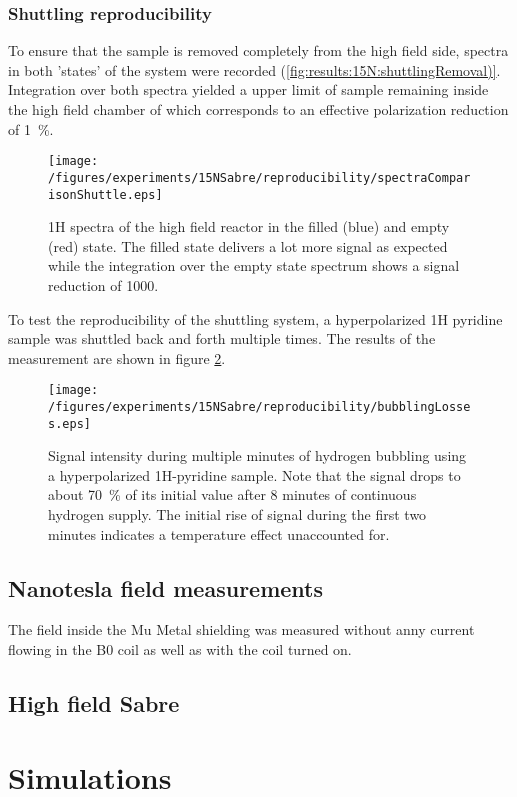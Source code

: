		\subsubsection{Shuttling reproducibility}
		To ensure that the sample is removed completely from the high field side, spectra in both 'states' of the system were recorded (\ref{fig:results:15N:shuttlingRemoval)}. Integration over both spectra yielded a upper limit of sample remaining inside the high field chamber of which corresponds to an effective polarization reduction of \SI{1}{\percent}.
		\begin{figure}
			\label{fig:results:15N:shuttlingRemoval}
			\centering
			\texttt{[image: /figures/experiments/15NSabre/reproducibility/spectraComparisonShuttle.eps]}
			\caption{1H spectra of the high field reactor in the filled (blue) and empty (red) state. The filled state delivers a lot more signal as expected while the integration over the empty state spectrum shows a signal reduction of 1000.}
		\end{figure}
		To test the reproducibility of the shuttling system, a hyperpolarized 1H pyridine sample was shuttled back and forth multiple times. The results of the measurement are shown in figure \ref{fig:results:15N:shuttlingReproducibility}. 
		\begin{figure}
			\label{fig:results:15N:shuttlingReproducibility}
			\centering
			\texttt{[image: /figures/experiments/15NSabre/reproducibility/bubblingLosses.eps]}
			\caption{Signal intensity during multiple minutes of hydrogen bubbling using a hyperpolarized 1H-pyridine sample. Note that the signal drops to about \SI{70}{\percent} of its initial value after 8 minutes of continuous hydrogen supply. The initial rise of signal during the first two minutes indicates a temperature effect unaccounted for.}
		\end{figure}
	\subsection{Nanotesla field measurements}
		The field inside the Mu Metal shielding was measured without anny current flowing in the B0 coil as well as with the coil turned on. 
	\subsection{High field Sabre}
\section{Simulations}
